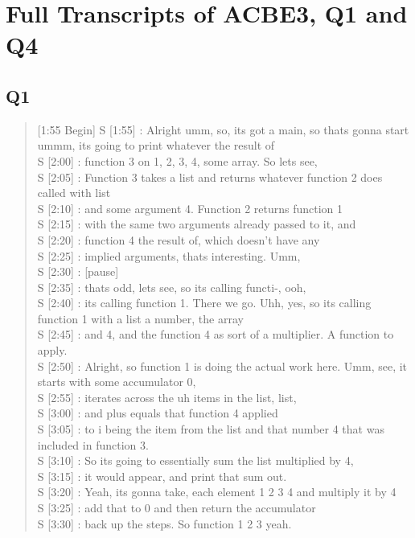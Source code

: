 \newpage

\section{Full Transcripts of ACBE3, Q1 and Q4}
\subsection{Q1}
\begin{quote}
[1:55 Begin]
S [1:55] : Alright umm, so, its got a main, so thats gonna start ummm, its going to print whatever the result of \\
S [2:00] : function 3 on 1, 2, 3, 4, some array. So lets see, \\
S [2:05] : Function 3 takes a list and returns whatever function  2 does called with list \\
S [2:10] : and some argument 4. Function 2 returns function 1 \\
S [2:15] : with the same two arguments already passed to it, and \\
S [2:20] : function 4 the result of, which doesn't have any \\
S [2:25] : implied arguments, thats interesting. Umm, \\
S [2:30] : [pause] \\
S [2:35] : thats odd, lets see, so its calling functi-, ooh, \\
S [2:40] : its calling function 1. There we go. Uhh, yes, so its calling function 1 with a list a number, the array \\
S [2:45] : and 4, and the function 4 as sort of a multiplier. A function to apply. \\
S [2:50] : Alright, so function 1 is doing the actual work here. Umm, see, it starts with some accumulator 0,  \\
S [2:55] : iterates across the uh items in the list, list, \\
S [3:00] : and plus equals that function 4 applied \\
S [3:05] : to i being the item from the list and that number 4 that was included in function 3. \\
S [3:10] : So its going to essentially sum the list multiplied by 4, \\
S [3:15] : it would appear, and print that sum out. \\
S [3:20] : Yeah, its gonna take, each element 1 2 3 4 and multiply it by 4 \\
S [3:25] : add that to 0 and then return the accumulator \\
S [3:30] : back up the steps. So function 1 2 3 yeah. \\
\end{quote}

